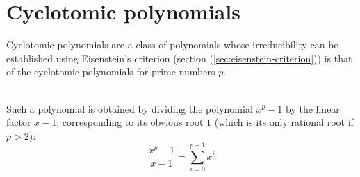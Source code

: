 \section{Cyclotomic polynomials}

Cyclotomic polynomials are a class of polynomials whose irreducibility can be established using Eisenstein's criterion (section (\ref{sec:eisenstein-criterion})) 
is that of the cyclotomic polynomials for prime numbers $p$.

\begin{definition}
\ \\
Such a polynomial is obtained by dividing the polynomial $x^p - 1$ by the linear factor $x - 1$, corresponding to its obvious root $1$ (which is its only 
rational root if $p > 2$):
\begin{displaymath}
\frac{x^p - 1}{x - 1} = \sum_{i=0}^{p-1} x^i 
\end{displaymath}
\end{definition} 